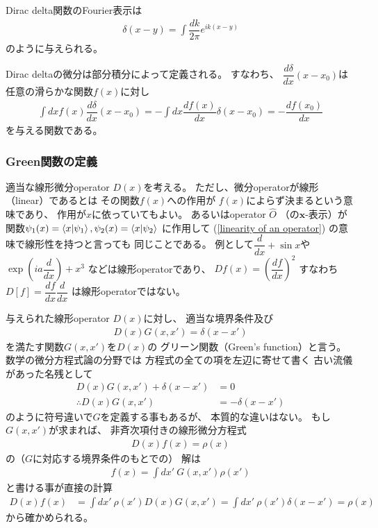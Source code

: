 Dirac delta関数のFourier表示は
\begin{align}
    \delta(x-y)
    =
    \int
    \dfrac{dk}{2\pi}
    e^{ik(x-y)}
\label{dirac delta fourier representation}
\end{align}
のように与えられる。

Dirac deltaの微分は部分積分によって定義される。
すなわち、
$\dfrac{d \delta}{dx}
    (x - x_0)$は
任意の滑らかな関数$f(x)$に対し
\begin{align}
    \int dx
    f(x)
    \dfrac{d \delta}{dx}
    (x - x_0)
=
    -
    \int dx
    \dfrac{d f(x)}{dx}
    \delta(x - x_0)
=
    -
    \dfrac{d f(x_0)}{dx}
\end{align}
を与える関数である。

\subsubsection{Green関数の定義}

適当な線形微分operator $D(x)$を考える。
ただし、微分operatorが線形（linear）であるとは
その関数$f(x)$への作用が
$f(x)$によらず決まるという意味であり、
作用が$x$に依っていてもよい。
あるいはoperator $\hat{O}$
（の$\bm{x}$-表示）が
関数$\psi_1(x) = \braket{x | \psi_1},
\psi_2(x) = \braket{x | \psi_2}$
に作用して
(\ref{linearity of an operator})
の意味で線形性を持つと言っても
同じことである。
例として$\dfrac{d}{dx} + \sin x$や
$\exp( i a \dfrac{d}{dx}) + x^3$
などは線形operatorであり、
$D f(x) = \left(
    \dfrac{d f}{dx}
\right)^2$
すなわち$D[f] = \dfrac{d f}{dx}
    \dfrac{d}{dx}$
は線形operatorではない。

与えられた線形operator $D(x)$に対し、
適当な境界条件及び
\begin{align}
    D(x) G(x, x')
    =
    \delta(x - x')
\end{align}
を満たす関数$G(x, x')$を$D(x)$の
グリーン関数（Green's function）と言う。
数学の微分方程式論の分野では
方程式の全ての項を左辺に寄せて書く
古い流儀があった名残として
\begin{align*}
    D(x) G(x, x')
    +
    \delta(x - x')
&=
    0
\\\therefore
    D(x) G(x, x')
&=
    -
    \delta(x - x')
\end{align*}
のように符号違いで$G$を定義する事もあるが、
本質的な違いはない。
もし$G(x, x')$が求まれば、
非斉次項付きの線形微分方程式
\begin{align}
    D(x) f(x)
    =
    \rho(x)
\end{align}
の（$G$に対応する境界条件のもとでの）
解は
\begin{align}
    f(x) =
    \int dx'\ 
        G(x, x')
        \rho(x')
\end{align}
と書ける事が直接の計算
\begin{align}
    D(x) f(x)
&=
    \int dx'\ 
        \rho(x')
    D(x)
        G(x, x')
=
    \int dx'\ 
        \rho(x')
    \delta (x - x')
=
    \rho(x)
\end{align}
から確かめられる。

